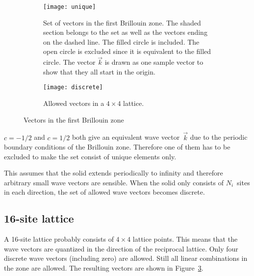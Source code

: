 \documentclass[11pt, english, fleqn, DIV=15, headinclude, BCOR=1cm]{scrartcl}
\begin{document}
\begin{figure}[htbp]
    \begin{subfigure}[t]{.5\linewidth}
        \centering
        \texttt{[image: unique]}
        \caption{%
            Set of vectors in the first Brillouin zone. The shaded section belongs
            to the set as well as the vectors ending on the dashed line. The filled
            circle is included. The open circle is excluded since it is equivalent
            to the filled circle. The vector $\vec k$ is drawn as one sample vector
            to show that they all start in the origin.
        }
        \label{fig:unique}
    \end{subfigure}
    \begin{subfigure}[t]{.5\linewidth}
        \centering
        \texttt{[image: discrete]}
        \caption{%
            Allowed vectors in a $4 \times 4$ lattice.
        }
        \label{fig:discrete}
    \end{subfigure}
    \caption{%
        Vectors in the first Brillouin zone
    }
\end{figure}

$c = - 1/2$ and $c = 1/2$ both give an equivalent wave vector~$\vec k$ due to
the periodic boundary conditions of the Brillouin zone. Therefore one of them
has to be excluded to make the set consist of unique elements only.

This assumes that the solid extends periodically to infinity and therefore
arbitrary small wave vectors are sensible. When the solid only consists of
$N_i$~sites in each direction, the set of allowed wave vectors becomes
discrete.

\subsection{16-site lattice}

A 16-site lattice probably consists of $4 \times 4$ lattice points. This means
that the wave vectors are quantized in the direction of the reciprocal lattice.
Only four discrete wave vectors (including zero) are allowed. Still all linear
combinations in the zone are allowed. The resulting vectors are shown in
Figure~\ref{fig:discrete}.
\end{document}
